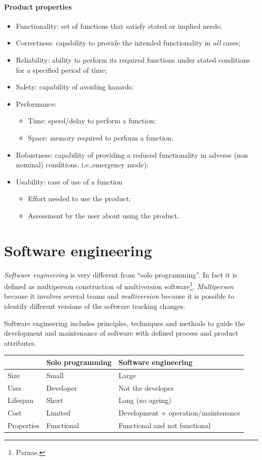\paragraph{Product properties}
\begin{itemize}
\item Functionality: set of functions that satisfy stated or implied needs;
\item Correctness: capability to provide the intended functionality in \emph{all} cases;
\item Reliability: ability to perform its required functions under stated conditions for a specified period of time;
\item Safety: capability of avoiding hazards;\item Performance:
\begin{itemize}
\item Time: speed/delay to perform a function;
\item Space: memory required to perform a function.
\end{itemize}
\item Robustness: capability of providing a reduced functionality in adverse (non nominal) conditions, i.e.,\@ emergency mode);
\item Usability: ease of use of a function \begin{itemize}
\item Effort needed to use the product;
\item Assessment by the user about using the product.
\end{itemize}
\end{itemize}

\section{Software engineering}
\emph{Software engineering} is very different from ``solo programming''. In fact it is defined as multiperson construction of multiversion software\footnote{Parnas.}. \emph{Multiperson} because it involves several teams and \emph{multiversion} because it is possible to identify different versions of the software tracking changes.

Software engineering includes principles, techniques and methods to guide the development and maintenance of software with defined process and product attributes.

\begin{center}
\begin{tabular}{l|p{}l}
\toprule
&	Solo programming	&	Software engineering	\\
\midrule
Size	&	Small	&	Large \\
User	&	Developer	&	Not the developer	\\
Lifespan	&	Short	&	Long (no ageing) \\
Cost	&	Limited	&	Development + operation/maintenance \\
Properties	&	Functional	& Functional and not functional	\\
\bottomrule
\end{tabular}
\end{center}

